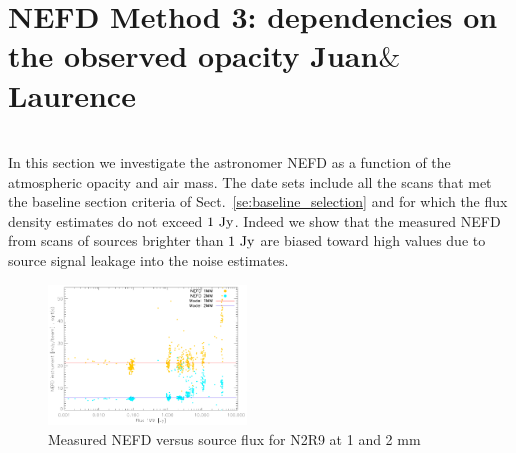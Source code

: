 

\section{NEFD Method 3: dependencies on the observed opacity {\color{blue} Juan$\&$Laurence}}
\label{NEFD_pipeline}


\\

In this section we investigate the astronomer NEFD as a function of
the atmospheric opacity and air mass.            
The date sets include all the scans that met the baseline section
criteria of Sect.~\ref{se:baseline_selection} and for which the flux
density estimates do not exceed $1~\rm{Jy}$. Indeed we show that the
measured NEFD from scans of sources brighter than $1~\rm{Jy}$ are
biased toward high values due to source signal leakage into the noise
estimates.

\begin{figure}
\begin{center}
 \includegraphics[clip=true,width=0.47\textwidth]{Figures/NEFDIndScans/nefd_flux1mm_run22.pdf}
 \caption[Measured NEFD versus source flux for N2R9 at 1 and 2 mm]{Measured NEFD versus source flux for N2R9 at 1 and 2 mm}
\label{fig:nefdvsbackground}
\end{center}
\end{figure}


